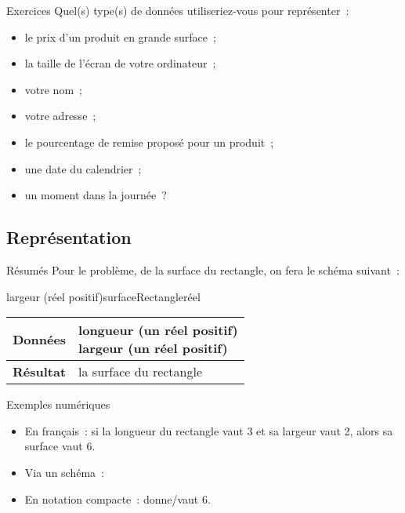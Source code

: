 \begin{frame}{Exercices}
  Quel(s) type(s) de données utiliseriez-vous pour représenter~:
  \begin{itemize}
    \item le prix d’un produit en grande surface~;
    \item la taille de l’écran de votre ordinateur~;
    \item votre nom~;
    \item votre adresse~;
    \item le pourcentage de remise proposé pour un produit~;
    \item une date du calendrier~;
    \item un moment dans la journée~?
  \end{itemize}
\end{frame}

\subsection{Représentation}
\begin{frame}{Résumés}
    Pour le problème, de la surface du rectangle, 
    on fera le schéma suivant~:

    \center{}
    {largeur (réel positif)}{surfaceRectangle}{réel}

    \begin{tabular}[t]{|>{\columncolor{black!40}}r|l|}
            \hline
            \textbf{Données} & \makecell[tl]{
                    longueur (un réel positif)\\
                    largeur (un réel positif)
            }\\
            \hline
            \textbf{Résultat} & la surface du rectangle\\
            \hline
    \end{tabular}
\end{frame}

\begin{frame}{Exemples numériques}
  \begin{itemize}
    \item En français~: 
      si la longueur du rectangle vaut 3 et sa largeur vaut 2, 
      alors sa surface vaut 6.
    \item Via un schéma~:
      \begin{center}
      \end{center}
    \item En notation compacte~:
       donne/vaut $6$.
  \end{itemize}
\end{frame}

